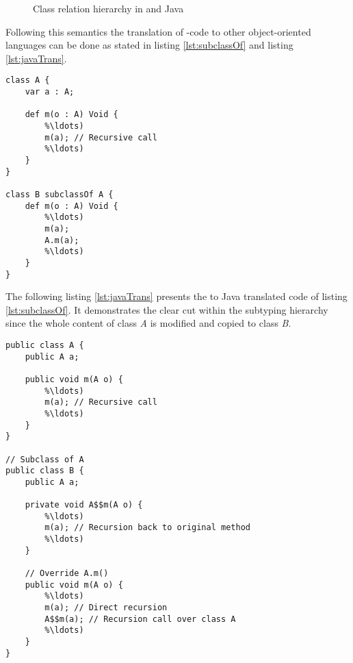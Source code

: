 \begin{figure}[h]
	\centering
	\caption{Class relation hierarchy in \ooplss and Java}
	\label{fig:inheritHierarchy}
\end{figure}


Following this semantics the translation of \ooplss-code to
other object-oriented languages can be done as stated in listing
\ref{lst:subclassOf} and listing \ref{lst:javaTrans}.

\begin{lstlisting}[float,language=ooplss,caption=Subclassing in \ooplss,label=lst:subclassOf]
class A {
	var a : A;

	def m(o : A) Void {
		%\ldots)
		m(a); // Recursive call
		%\ldots)
	}
}

class B subclassOf A {
	def m(o : A) Void {
		%\ldots)
		m(a);
		A.m(a);
		%\ldots)
	}
}
\end{lstlisting}

The following listing \ref{lst:javaTrans} presents the to Java translated
code of listing \ref{lst:subclassOf}. It demonstrates the clear cut within 
the subtyping hierarchy since the whole content of class \emph{A} is modified
and copied to class \emph{B}.

\begin{lstlisting}[float,caption=Subtyping translated in Java,label=lst:javaTrans]
public class A {
	public A a;

	public void m(A o) {
		%\ldots)
		m(a); // Recursive call
		%\ldots)
	}
}

// Subclass of A
public class B {
	public A a;

	private void A$$m(A o) {
		%\ldots)
		m(a); // Recursion back to original method
		%\ldots)
	}

	// Override A.m()
	public void m(A o) {
		%\ldots)
		m(a); // Direct recursion
		A$$m(a); // Recursion call over class A
		%\ldots)
	}
}
\end{lstlisting}

